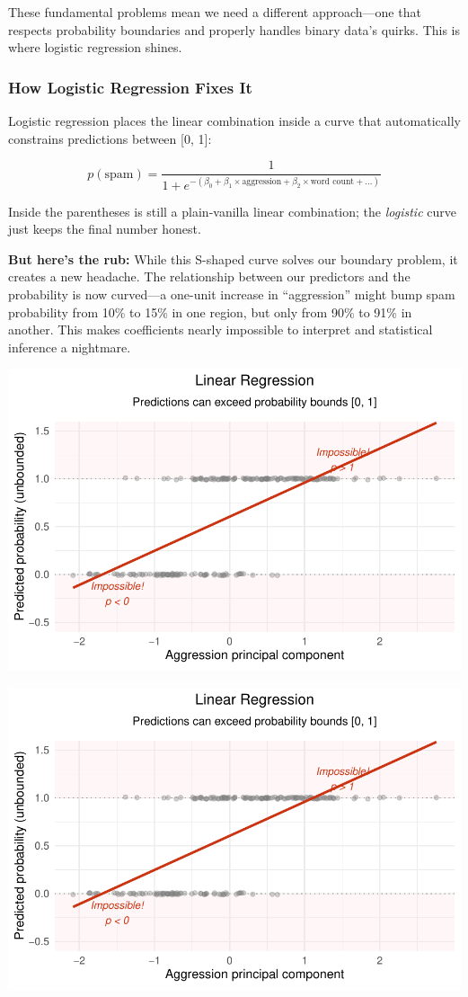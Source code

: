 \documentclass[
  letterpaper,
  DIV=11,
  numbers=noendperiod]{scrartcl}
\begin{document}
These fundamental problems mean we need a different approach---one that
respects probability boundaries and properly handles binary data's
quirks. This is where logistic regression shines.

\subsubsection{How Logistic Regression Fixes
It}\label{how-logistic-regression-fixes-it}

Logistic regression places the linear combination inside a curve that
automatically constrains predictions between {[}0, 1{]}:

\[p(\text{spam}) = \frac{1}{1 + e^{-(\beta_0 + \beta_1 \times \text{aggression} + \beta_2 \times \text{word count} + ...)}}\]

Inside the parentheses is still a plain-vanilla linear combination; the
\emph{logistic} curve just keeps the final number honest.

\textbf{But here's the rub:} While this S-shaped curve solves our
boundary problem, it creates a new headache. The relationship between
our predictors and the probability is now curved---a one-unit increase
in ``aggression'' might bump spam probability from 10\% to 15\% in one
region, but only from 90\% to 91\% in another. This makes coefficients
nearly impossible to interpret and statistical inference a nightmare.

\begin{center}
\includegraphics[width=0.8\linewidth,height=\textheight,keepaspectratio]{Beyond!!!_files/figure-pdf/unnamed-chunk-4-1.pdf}
\end{center}

\begin{center}
\includegraphics[width=0.8\linewidth,height=\textheight,keepaspectratio]{Beyond!!!_files/figure-pdf/unnamed-chunk-4-2.pdf}
\end{center}
\end{document}
